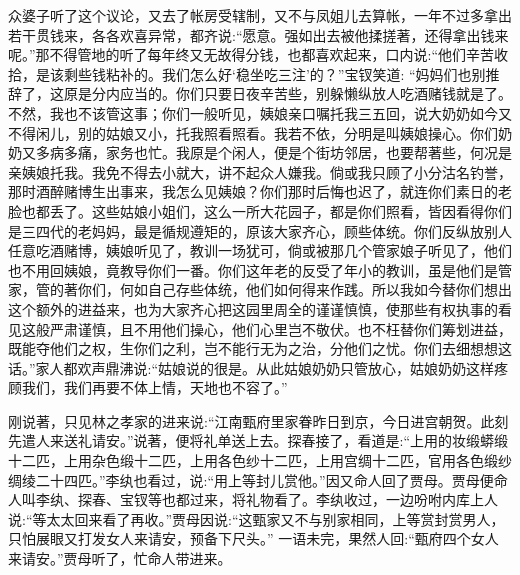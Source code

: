 \begin{parag}
    众婆子听了这个议论，又去了帐房受辖制，又不与凤姐儿去算帐，一年不过多拿出若干贯钱来，各各欢喜异常，都齐说:“愿意。强如出去被他揉搓著，还得拿出钱来呢。”那不得管地的听了每年终又无故得分钱，也都喜欢起来，口内说:“他们辛苦收拾，是该剩些钱粘补的。我们怎么好‘稳坐吃三注’的？”宝钗笑道: “妈妈们也别推辞了，这原是分内应当的。你们只要日夜辛苦些，别躲懒纵放人吃酒赌钱就是了。不然，我也不该管这事；你们一般听见，姨娘亲口嘱托我三五回，说大奶奶如今又不得闲儿，别的姑娘又小，托我照看照看。我若不依，分明是叫姨娘操心。你们奶奶又多病多痛，家务也忙。我原是个闲人，便是个街坊邻居，也要帮著些，何况是亲姨娘托我。我免不得去小就大，讲不起众人嫌我。倘或我只顾了小分沽名钓誉，那时酒醉赌博生出事来，我怎么见姨娘？你们那时后悔也迟了，就连你们素日的老脸也都丢了。这些姑娘小姐们，这么一所大花园子，都是你们照看，皆因看得你们是三四代的老妈妈，最是循规遵矩的，原该大家齐心，顾些体统。你们反纵放别人任意吃酒赌博，姨娘听见了，教训一场犹可，倘或被那几个管家娘子听见了，他们也不用回姨娘，竟教导你们一番。你们这年老的反受了年小的教训，虽是他们是管家，管的著你们，何如自己存些体统，他们如何得来作践。所以我如今替你们想出这个额外的进益来，也为大家齐心把这园里周全的谨谨慎慎，使那些有权执事的看见这般严肃谨慎，且不用他们操心，他们心里岂不敬伏。也不枉替你们筹划进益，既能夺他们之权，生你们之利，岂不能行无为之治，分他们之忧。你们去细想想这话。”家人都欢声鼎沸说:“姑娘说的很是。从此姑娘奶奶只管放心，姑娘奶奶这样疼顾我们，我们再要不体上情，天地也不容了。”
\end{parag}


\begin{parag}
    刚说著，只见林之孝家的进来说:“江南甄府里家眷昨日到京，今日进宫朝贺。此刻先遣人来送礼请安。”说著，便将礼单送上去。探春接了，看道是:“上用的妆缎蟒缎十二匹，上用杂色缎十二匹，上用各色纱十二匹，上用宫绸十二匹，官用各色缎纱绸绫二十四匹。”李纨也看过，说:“用上等封儿赏他。”因又命人回了贾母。贾母便命人叫李纨、探春、宝钗等也都过来，将礼物看了。李纨收过，一边吩咐内库上人说:“等太太回来看了再收。”贾母因说:“这甄家又不与别家相同，上等赏封赏男人，只怕展眼又打发女人来请安，预备下尺头。” 一语未完，果然人回:“甄府四个女人来请安。”贾母听了，忙命人带进来。
\end{parag}


